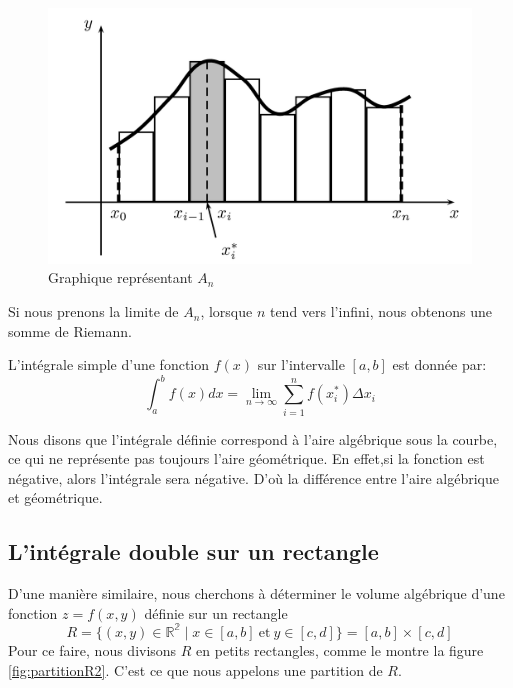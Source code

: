 \documentclass[]{book}
\theoremstyle{definition}
\theoremstyle{definition}
\theoremstyle{definition}
\theoremstyle{remark}
\let\BeginKnitrBlock\begin \let\EndKnitrBlock\end
\begin{document}
\begin{figure}

{\centering \includegraphics[width=0.75\linewidth]{resources/images/latex/integralesimple} 

}

\caption{Graphique représentant $A_n$}\label{fig:integralesimple}
\end{figure}

Si nous prenons la limite de \(A_n\), lorsque \(n\) tend vers l'infini,
nous obtenons une somme de Riemann.
\BeginKnitrBlock{definition}[L'intégrale simple]
\protect\hypertarget{def:unnamed-chunk-238}{}{\label{def:unnamed-chunk-238}
{} }L'intégrale simple d'une fonction
\(f(x)\) sur l'intervalle \([a,b]\) est donnée par:
\[ \int_a^b f(x)dx = \lim_{n\to\infty}\sum_{i=1}^n f(x_i^*)\Delta x_i\]
\EndKnitrBlock{definition}

\BeginKnitrBlock{remark}
{}Nous disons que l'intégrale définie
correspond à l'aire algébrique sous la courbe, ce qui ne représente pas
toujours l'aire géométrique. En effet,si la fonction est négative, alors
l'intégrale sera négative. D'où la différence entre l'aire algébrique et
géométrique.
\EndKnitrBlock{remark}

\hypertarget{lintegrale-double-sur-un-rectangle}{%
\subsection{L'intégrale double sur un
rectangle}\label{lintegrale-double-sur-un-rectangle}}

D'une manière similaire, nous cherchons à déterminer le volume
algébrique d'une fonction \(z=f(x,y)\) définie sur un rectangle
\[R=\{(x,y)\in\mathbb{R^2}\mid x\in [a,b]\ \text{et}\ y\in[c,d]\}=[a,b]\times[c,d]\]
Pour ce faire, nous divisons \(R\) en petits rectangles, comme le montre
la figure \ref{fig:partitionR2}. C'est ce que nous appelons une
partition de \(R\).
\end{document}
